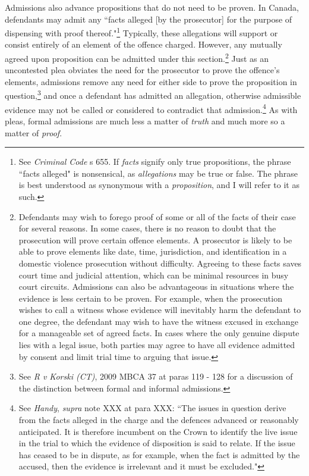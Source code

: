 Admissions also advance propositions that do not need to be proven. In Canada, defendants may admit any ``facts alleged [by the prosecutor] for the purpose of dispensing with proof thereof."\footnote{See \textit{Criminal Code} s 655. If \textit{facts} signify only true propositions, the phrase ``facts alleged" is nonsensical, as \textit{allegations} may be true or false. The phrase is best understood as synonymous with a \textit{proposition}, and I will refer to it as such.} Typically, these allegations will support or consist entirely of an element of the offence charged. However, any mutually agreed upon proposition can be admitted under this section.\footnote{Defendants may wish to forego proof of some or all of the facts of their case for several reasons. In some cases, there is no reason to doubt that the prosecution will prove certain offence elements. A prosecutor is likely to be able to prove elements like date, time, jurisdiction, and identification in a domestic violence prosecution without difficulty. Agreeing to these facts saves court time and judicial attention, which can be minimal resources in busy court circuits. Admissions can also be advantageous in situations where the evidence is less certain to be proven. For example, when the prosecution wishes to call a witness whose evidence will inevitably harm the defendant to one degree, the defendant may wish to have the witness excused in exchange for a manageable set of agreed facts. In cases where the only genuine dispute lies with a legal issue, both parties may agree to have all evidence admitted by consent and limit trial time to arguing that issue.} Just as an uncontested plea obviates the need for the prosecutor to prove the offence's elements, admissions remove any need for either side to prove the proposition in question,\footnote{See \textit{R v Korski (CT)}, 2009 MBCA 37 at paras 119 - 128 for a discussion of the distinction between formal and informal admissions.} and once a defendant has admitted an allegation, otherwise admissible evidence may not be called or considered to contradict that admission.\footnote{See \textit{Handy}, \textit{supra} note XXX at para XXX: ``The issues in question derive from the facts alleged in the charge and the defences advanced or reasonably anticipated. It is therefore incumbent on the Crown to identify the live issue in the trial to which the evidence of disposition is said to relate. If the issue has ceased to be in dispute, as for example, when the fact is admitted by the accused, then the evidence is irrelevant and it must be excluded."} As with pleas, formal admissions are much less a matter of \textit{truth} and much more so a matter of \textit{proof}.

